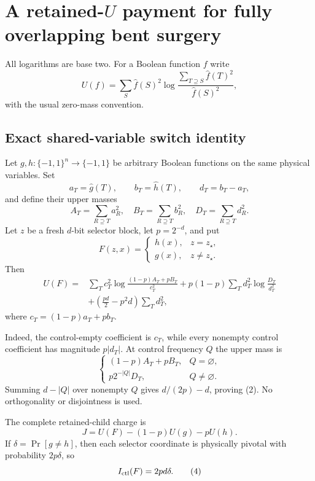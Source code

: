\section*{A retained-$U$ payment for fully overlapping bent surgery}

All logarithms are base two.  For a Boolean function $f$ write
\[
 U(f)=\sum_S\widehat f(S)^2
 \log\frac{\sum_{T\supseteq S}\widehat f(T)^2}{\widehat f(S)^2},
\]
with the usual zero-mass convention.

\subsection*{Exact shared-variable switch identity}

Let $g,h:\{-1,1\}^n\to\{-1,1\}$ be arbitrary Boolean functions on the
same physical variables.  Set
\[
 a_T=\widehat g(T),\qquad b_T=\widehat h(T),\qquad d_T=b_T-a_T,
\]
and define their upper masses
\[
 A_T=\sum_{R\supseteq T}a_R^2,\quad
 B_T=\sum_{R\supseteq T}b_R^2,\quad
 D_T=\sum_{R\supseteq T}d_R^2.
\]
Let $z$ be a fresh $d$-bit selector block, let $p=2^{-d}$, and put
\[
 F(z,x)=\begin{cases}h(x),&z=z_\star,\\g(x),&z\ne z_\star.\end{cases}       \tag{1}
\]
Then
\begin{align}
 U(F)={}&\sum_T c_T^2\log\frac{(1-p)A_T+pB_T}{c_T^2}
 +p(1-p)\sum_Td_T^2\log\frac{D_T}{d_T^2} \\
 &+\left(\frac{pd}{2}-p^2d\right)\sum_Td_T^2,                 \tag{2}
\end{align}
where $c_T=(1-p)a_T+pb_T$.

Indeed, the control-empty coefficient is $c_T$, while every nonempty
control coefficient has magnitude $p|d_T|$.  At control frequency $Q$ the
upper mass is
\[
 \begin{cases}
 (1-p)A_T+pB_T,&Q=\varnothing,\\
 p2^{-|Q|}D_T,&Q\ne\varnothing.
 \end{cases}
\]
Summing $d-|Q|$ over nonempty $Q$ gives $d/(2p)-d$, proving (2).  No
orthogonality or disjointness is used.

The complete retained-child charge is
\[
 J=U(F)-(1-p)U(g)-pU(h).                                  \tag{3}
\]
If $\delta=\Pr[g\ne h]$, then each selector coordinate is physically
pivotal with probability $2p\delta$, so
\[
 I_{\rm ctl}(F)=2pd\delta.                                \tag{4}
\]

